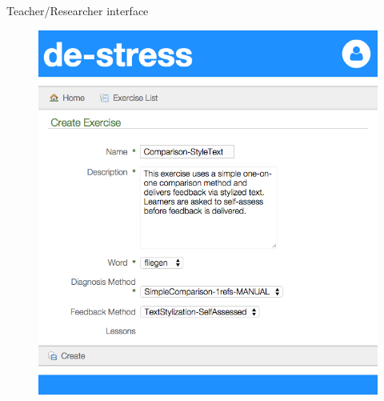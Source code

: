 \documentclass[xcolor={dvipsnames}]{beamer}
\begin{document}
		\begin{frame}{Teacher/Researcher interface}
		\begin{figure}
		\includegraphics[height=.85\textheight]{../img/screenshots/TeacherInterface-smaller}
		\end{figure}
		\end{frame}
		
\end{document}
